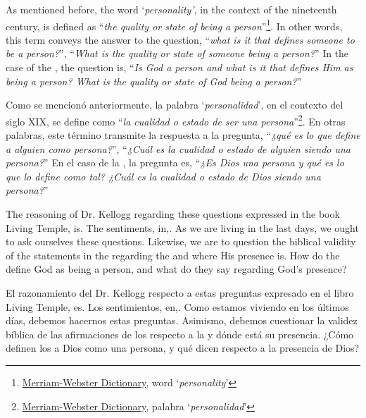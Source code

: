 As mentioned before, the word ‘\textit{personality’}, in the context of the nineteenth century, is defined as “\textit{the quality or state of being a person}”\footnote{\href{https://www.merriam-webster.com/dictionary/personality}{Merriam-Webster Dictionary}, word ‘\textit{personality}’}. In other words, this term conveys the answer to the question, “\textit{what is it that defines someone to be a person?}”, “\textit{What is the quality or state of someone being a person?}” In the case of the , the question is, “\textit{Is God a person and what is it that defines Him as being a person? What is the quality or state of God being a person?}”


Como se mencionó anteriormente, la palabra ‘\textit{personalidad}’, en el contexto del siglo XIX, se define como “\textit{la cualidad o estado de ser una persona}”\footnote{\href{https://www.merriam-webster.com/dictionary/personality}{Merriam-Webster Dictionary}, palabra ‘\textit{personalidad}’}. En otras palabras, este término transmite la respuesta a la pregunta, “\textit{¿qué es lo que define a alguien como persona?}”, “\textit{¿Cuál es la cualidad o estado de alguien siendo una persona?}” En el caso de la , la pregunta es, “\textit{¿Es Dios una persona y qué es lo que lo define como tal? ¿Cuál es la cualidad o estado de Dios siendo una persona?}”


The reasoning of Dr. Kellogg regarding these questions expressed in the book Living Temple, is. The sentiments, in,. As we are living in the last days, we ought to ask ourselves these questions. Likewise, we are to question the biblical validity of the statements in the  regarding the  and where His presence is. How do the  define God as being a person, and what do they say regarding God’s presence?


El razonamiento del Dr. Kellogg respecto a estas preguntas expresado en el libro Living Temple, es. Los sentimientos, en,. Como estamos viviendo en los últimos días, debemos hacernos estas preguntas. Asimismo, debemos cuestionar la validez bíblica de las afirmaciones de los  respecto a la  y dónde está su presencia. ¿Cómo definen los  a Dios como una persona, y qué dicen respecto a la presencia de Dios?


